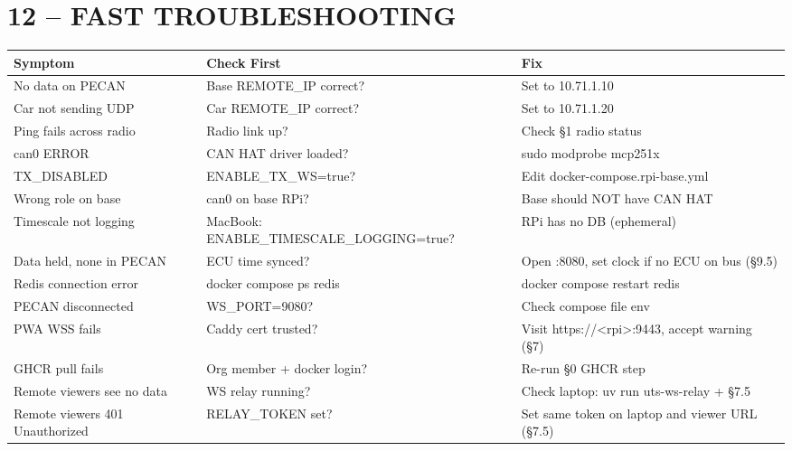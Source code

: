 \documentclass[a5paper,10pt]{article}
\newcommand{\cmd}[1]{{\ttfamily\scriptsize #1}}
\begin{document}
\section*{12 -- FAST TROUBLESHOOTING}

\noindent
\begin{tabularx}{\linewidth}{p{26mm}p{50mm}X}
  \toprule
  \textbf{Symptom} & \textbf{Check First} & \textbf{Fix} \\
  \midrule
  No data on PECAN & Base REMOTE\_IP correct? & Set to \cmd{10.71.1.10} \\
  Car not sending UDP & Car REMOTE\_IP correct? & Set to \cmd{10.71.1.20} \\
  Ping fails across radio & Radio link up? & Check \S 1 radio status \\
  can0 ERROR & CAN HAT driver loaded? & \cmd{sudo modprobe mcp251x} \\
  TX\_DISABLED & ENABLE\_TX\_WS=true? & Edit docker-compose.rpi-base.yml \\
  Wrong role on base & can0 on base RPi? & Base should NOT have CAN HAT \\
  Timescale not logging & MacBook: \cmd{ENABLE\_TIMESCALE\_LOGGING=true}? & RPi has no DB (ephemeral) \\
  Data held, none in PECAN & ECU time synced? & Open :8080, set clock if no ECU on bus (\S 9.5) \\
  Redis connection error & \cmd{docker compose ps redis} & \cmd{docker compose restart redis} \\
  PECAN disconnected & WS\_PORT=9080? & Check compose file env \\
  PWA WSS fails & Caddy cert trusted? & Visit \cmd{https://<rpi>:9443}, accept warning (\S 7) \\
  GHCR pull fails & Org member + docker login? & Re-run \S 0 GHCR step \\
  Remote viewers see no data & WS relay running? & Check laptop: \cmd{uv run uts-ws-relay} + \S 7.5 \\
  Remote viewers 401 Unauthorized & RELAY\_TOKEN set? & Set same token on laptop and viewer URL (\S 7.5) \\
  \bottomrule
\end{tabularx}
\vspace{2mm}

\end{document}
